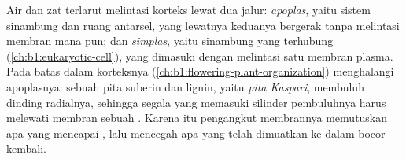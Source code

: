 \begin{definition}\label{def:b1:plant-water-minerals:pathways}
Air dan zat terlarut melintasi korteks  lewat dua jalur:
\emph{apoplas}, yaitu sistem sinambung  dan ruang antarsel,
yang lewatnya keduanya bergerak tanpa melintasi membran mana pun; dan
\emph{simplas}, yaitu  sinambung  yang terhubung
 (\cref{ch:b1:eukaryotic-cell}), yang dimasuki dengan
melintasi satu membran plasma. Pada batas dalam korteksnya
\emph{} (\cref{ch:b1:flowering-plant-organization})
menghalangi apoplasnya: sebuah pita suberin dan lignin, yaitu
\emph{pita Kaspari}, membuluh dinding radialnya, sehingga segala yang
memasuki silinder pembuluhnya harus melewati membran sebuah 
. Karena itu pengangkut membrannya memutuskan apa yang
mencapai , lalu mencegah apa yang telah dimuatkan ke dalam
 bocor kembali.
\end{definition}

